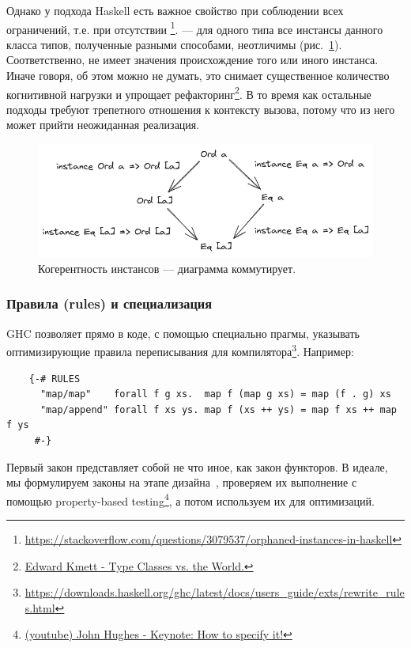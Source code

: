 Однако у подхода Haskell есть важное свойство при соблюдении всех ограничений, т.е. при отсутствии \footnote{\url{https://stackoverflow.com/questions/3079537/orphaned-instances-in-haskell}}.
 --- для одного типа все инстансы данного класса типов, полученные разными способами, неотличимы (рис.~\ref{fig:coherence}).
Соответственно, не имеет значения происхождение того или иного инстанса.
Иначе говоря, об этом можно не думать, это снимает существенное количество когнитивной нагрузки и упрощает рефакторинг\footnote{\href{https://youtu.be/hIZxTQP1ifo?si=aG2Lk2eb-5E5SOLb}{Edward Kmett - Type Classes vs. the World.}}.
В то время как остальные подходы требуют трепетного отношения к контексту вызова, потому что из него может прийти неожиданная реализация.

\begin{figure}[h]
    \centering
    \includegraphics[width=0.8\linewidth]{figs/coherence}
    \caption{Когерентность инстансов --- диаграмма коммутирует.}
    \label{fig:coherence}
\end{figure}

\subsubsection{Правила (rules) и специализация}

GHC позволяет прямо в коде, с помощью специально прагмы, указывать оптимизирующие правила переписывания для компилятора\footnote{\url{https://downloads.haskell.org/ghc/latest/docs/users_guide/exts/rewrite_rules.html}}.
Например:
\begin{verbatim}
    {-# RULES
      "map/map"    forall f g xs.  map f (map g xs) = map (f . g) xs
      "map/append" forall f xs ys. map f (xs ++ ys) = map f xs ++ map f ys
     #-}
\end{verbatim}

Первый закон представляет собой не что иное, как закон функторов.
В идеале, мы формулируем законы на этапе дизайна~\cite{maguire-algebra}, проверяем их выполнение с помощью property-based testing\footnote{\href{https://youtu.be/G0NUOst-53U?si=vdcKVUi9vSPBY0Jz}{(youtube) John Hughes - Keynote: How to specify it!}}, а потом используем их для оптимизаций.

